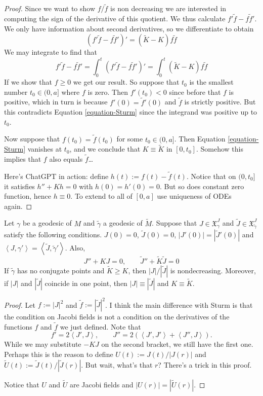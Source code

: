 \begin{proof}
Since we want to show $f/\tilde{f}$ is non decreasing we are interested in
computing the sign of the derivative of this quotient. We thus calculate 
$f'\tilde{f}-f \tilde{f}'$. We only have information about second derivatives,
so we differentiate to obtain
$$
(f'\tilde{f}-f \tilde{f}')'=(\tilde{K}-K)f\tilde{f}
$$
We may integrate to find that 
\begin{equation}
\label{equation-Sturm}
f'\tilde{f}-f \tilde{f}'=\int_0^t (f'\tilde{f}-f \tilde{f}')'
=\int_0^t (\tilde{K}-K)f\tilde{f}
\end{equation}
If we show that $f\geq 0$ we get our result. So suppose that $t_0$ is the
smallest number $t_0 \in (0,a]$ where $f$ is zero. Then $f'(t_0)<0$ since before
that $f$ is positive, which in turn is because $f'(0)=\tilde{f}'(0)$ and
$\tilde{f}$ is strictly positive. But this contradicts Equation
\ref{equation-Sturm} since the integrand was positive up to $t_0$.

Now suppose that $f(t_0)=\tilde{f}(t_0)$ for some $t_0 \in (0,a]$. Then Equation
\ref{equation-Sturm} vanishes at $t_0$, and we conclude that $K \equiv
\tilde{K}$ in $[0,t_0]$. Somehow this implies that $f$ also equals $\tilde{f}$…

Here's ChatGPT in action: define $h(t):=f(t)-\tilde{f}(t)$. Notice that on
$(0,t_0]$ it satisfies $h''+Kh=0$ with $h(0)=h'(0)=0$. But so does constant zero
function, hence  $h\equiv0$. To extend to all of $[0,a]$ use uniqueness of
ODEs again.
\end{proof}

\begin{theorem}[Rauch]
\label{theorem-Rauch}
Let $\gamma$ be a geodesic of $M$ and $\tilde{\gamma}$ a geodesic of
$\tilde{M}$. Suppose that $J \in \mathfrak{X}^J_\gamma$ and $\tilde{J}\in
\mathfrak{X}^J_{\tilde{\gamma}}$ satisfy the following conditions. $J(0)=0$,
$\tilde{J}(0)=0$, $|J'(0)|=|\tilde{J}'(0)|$ and 
$\left<J,\gamma'\right>=\left<\tilde{J},\tilde{\gamma}'\right>$. Also,
$$
J''+K J=0,\qquad \tilde{J}''+\tilde{K}\tilde{J}=0
$$
If $\tilde{\gamma}$ has no conjugate points and $\tilde{K}\geq K$, then 
$|J|/|\tilde{J}|$ is nondecreasing. Moreover, if $|J|$ and $|\tilde{J}|$
coincide in one point, then $|J|\equiv |\tilde{J}|$ and $K \equiv \tilde{K}$.
\end{theorem}

\begin{proof}
Let $f:=|J|^2$ and $\tilde{f}:=|\tilde{J}|^2$. I think the main difference with
Sturm is that the condition on Jacobi fields is not a condition on the
derivatives of the functions $f$ and $\tilde{f}$ we just defined. Note that
$$
f'=2\left<J',J\right>,\qquad J''=2(\left<J',J'\right>+\left<J'',J\right>).
$$
While we may substitute $-KJ$ on the second bracket, we still have the first
one. Perhaps this is the reason to define $U(t):=J(t)/|J(r)|$ and
$\tilde{U}(t):=\tilde{J}(t)/|\tilde{J}(r)|$. But wait, what's that $r$? There's
a trick in this proof.

Notice that $U$ and $\tilde{U}$ are Jacobi fields and $|U(r)|=|\tilde{U}(r)|$.
\end{proof}


